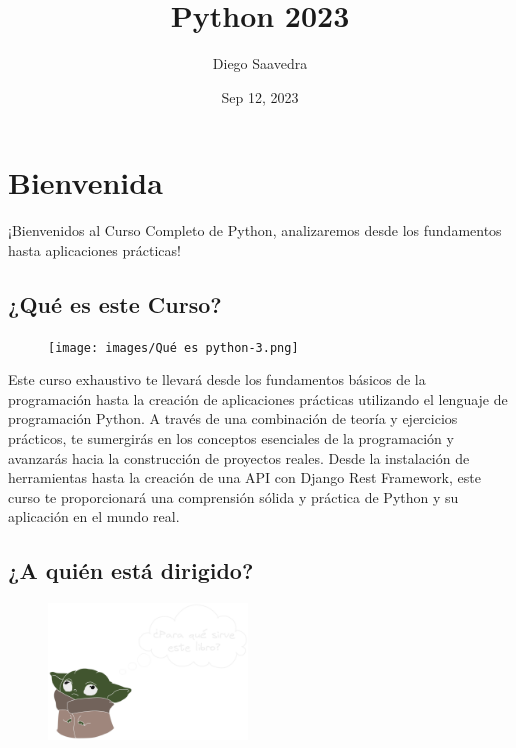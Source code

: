 \documentclass[
  a4paper,
  DIV=11,
  numbers=noendperiod,
  onepage,
  openany]{scrreprt}
\title{Python 2023}
\author{Diego Saavedra}
\date{Sep 12, 2023}
\renewcommand*\contentsname{Table of contents}
\newcommand\contentsname{Table of contents}
\begin{document}
\maketitle
\renewcommand*\contentsname{Table of contents}
{
\hypersetup{linkcolor=}
\setcounter{tocdepth}{2}
\tableofcontents
}

\chapter{Bienvenida}\label{bienvenida}

¡Bienvenidos al Curso Completo de Python, analizaremos desde los
fundamentos hasta aplicaciones prácticas!

\section{¿Qué es este Curso?}\label{quuxe9-es-este-curso}

\begin{figure}

{\centering \texttt{[image: images/Qué es python-3.png]}

}

\end{figure}

Este curso exhaustivo te llevará desde los fundamentos básicos de la
programación hasta la creación de aplicaciones prácticas utilizando el
lenguaje de programación Python. A través de una combinación de teoría y
ejercicios prácticos, te sumergirás en los conceptos esenciales de la
programación y avanzarás hacia la construcción de proyectos reales.
Desde la instalación de herramientas hasta la creación de una API con
Django Rest Framework, este curso te proporcionará una comprensión
sólida y práctica de Python y su aplicación en el mundo real.

\section{¿A quién está dirigido?}\label{a-quiuxe9n-estuxe1-dirigido}

\begin{figure}

{\centering \includegraphics[width=2.08333in,height=\textheight]{images/para que sirve-2.png}

}

\end{figure}
\end{document}
